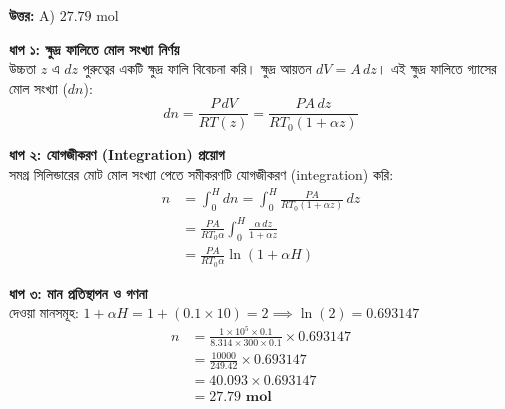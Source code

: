 \documentclass[12pt, a4paper]{article}
\begin{document}
\vspace{0.5em}
\begin{tcolorbox}[answerbox]
    \textbf{\color{success} উত্তর:} A) $27.79\text{ mol}$
\end{tcolorbox}
\vspace{1em}

\begin{tcolorbox}[solutionbox={সমাধান (Solution)}]
    \noindent
    \textbf{ধাপ ১: ক্ষুদ্র ফালিতে মোল সংখ্যা নির্ণয়} \\
    উচ্চতা $z$ এ $dz$ পুরুত্বের একটি ক্ষুদ্র ফালি বিবেচনা করি। ক্ষুদ্র আয়তন $dV = A \, dz$। এই ক্ষুদ্র ফালিতে গ্যাসের মোল সংখ্যা ($dn$):
    \[ dn = \frac{P \, dV}{R T(z)} = \frac{P A \, dz}{R T_0 (1 + \alpha z)} \]
    
    \vspace{0.4em}
    \noindent\textbf{ধাপ ২: যোগজীকরণ (Integration) প্রয়োগ} \\
    সমগ্র সিলিন্ডারের মোট মোল সংখ্যা পেতে সমীকরণটি যোগজীকরণ (integration) করি:
    \begin{align*}
        n &= \int_0^H dn = \int_0^H \frac{P A}{R T_0 (1 + \alpha z)} \, dz \\
        &= \frac{P A}{R T_0 \alpha} \int_0^H \frac{\alpha \, dz}{1 + \alpha z} \\
        &= \frac{P A}{R T_0 \alpha} \ln(1 + \alpha H)
    \end{align*}
    
    \vspace{0.4em}
    \noindent\textbf{ধাপ ৩: মান প্রতিস্থাপন ও গণনা} \\
    দেওয়া মানসমূহ: $1 + \alpha H = 1 + (0.1 \times 10) = 2 \implies \ln(2) = 0.693147$
    \begin{align*}
        n &= \frac{1 \times 10^5 \times 0.1}{8.314 \times 300 \times 0.1} \times 0.693147 \\
        &= \frac{10000}{249.42} \times 0.693147 \\
        &= 40.093 \times 0.693147 \\
        &= \mathbf{27.79\text{ mol}}
    \end{align*}
\end{tcolorbox}
\end{document}
